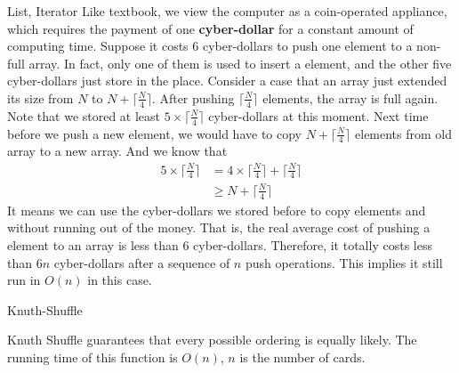 \pagebreak

\begin{homeworkProblem}{List, Iterator}
    Like textbook, we view the computer as a coin-operated appliance, which requires
    the payment of one \textbf{cyber-dollar} for a constant amount of computing time.
    Suppose it costs 6 cyber-dollars to push one element to a non-full array. In fact,
    only one of them is used to insert a element, and the other five cyber-dollars just
    store in the place. Consider a case that an array just extended its size from 
    $N$ to $N + \lceil \frac{N}{4} \rceil$. After pushing $\lceil \frac{N}{4} \rceil$ elements, 
    the array is full again. Note that we stored at least 
    $5 \times \lceil \frac{N}{4}\rceil$ cyber-dollars at this moment. Next time before
    we push a new element, we would have to copy $N + \lceil \frac{N}{4} \rceil$
    elements from old array to a new array. And we know that
    \[
        \begin{split}
            5 \times \lceil \frac{N}{4}\rceil &= 4 \times \lceil \frac{N}{4}\rceil + \lceil \frac{N}{4}\rceil \\
            &\geq N + \lceil \frac{N}{4}\rceil
        \end{split}
    \]
    It means we can use the cyber-dollars we stored before to copy elements and
    without running out of the money. That is, the real average cost of pushing a element 
    to an array is less than 6 cyber-dollars. Therefore, it totally costs less than $6n$
    cyber-dollars after a sequence of $n$ push operations. This implies it still run in
    $O(n)$ in this case.

    


    \begin{algorithm}[]
        \begin{algorithmic}[1]
            \EndFor
            \EndFunction{}
        \end{algorithmic}
        \caption{Knuth-Shuffle}
    \end{algorithm}

    Knuth Shuffle guarantees that every possible ordering is equally likely. The running time
    of this function is $O(n)$, $n$ is the number of cards.


\end{homeworkProblem}


